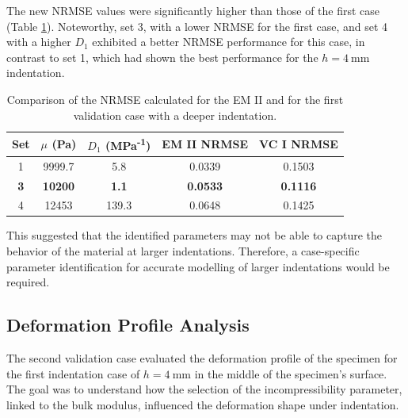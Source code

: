 The new NRMSE values were significantly higher than those of the first case (Table \ref{tab:nrmse8mm}). 
Noteworthy, set \SI{3}{}, with a lower NRMSE for the first case, and set \SI{4}{} with a higher $D_1$ 
exhibited a better NRMSE performance for this case, in contrast to set \SI{1}{}, which had shown 
the best performance for the $h=\SI{4}{\milli \meter}$ indentation.\\

\begin{table}[ht!]
    \centering
    \begin{tabular}{|c|c|c|c|c|}
    \hline
    Set & $\mu$ (Pa) & $D_1$ (MPa\textsuperscript{-1}) & EM II NRMSE & VC I NRMSE\\
    \hline
    1 & 9999.7 & 5.8 & 0.0339 & 0.1503\\
    \textbf{3} & \textbf{10200} & \textbf{1.1} & \textbf{0.0533} & \textbf{0.1116}\\
    4 & 12453 & 139.3 & 0.0648 & 0.1425\\
    \hline
    \end{tabular}
    \caption[NRMSE for first validation case]{Comparison of the NRMSE calculated for the EM II and for the first validation case with a deeper indentation.}
	\label{tab:nrmse8mm}
\end{table}

This suggested that the identified parameters may not be able to capture the behavior 
of the material at larger indentations. Therefore, a case-specific parameter identification
for accurate modelling of larger indentations would be required.\\

\subsection{Deformation Profile Analysis}
\label{subsection:defprofanalysis}
The second validation case evaluated the deformation profile of the specimen for the first 
indentation case of $h=\SI{4}{\milli \meter}$ in the middle of the specimen's surface. The goal 
was to understand how the selection of the incompressibility parameter, linked to the 
bulk modulus, influenced the deformation shape under indentation.\\

